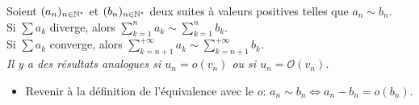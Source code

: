 \begin{tcolorbox}
    Soient $(a_n)_{n \in \mathbb{N}^\star}$ et $(b_n)_{n \in \mathbb{N}^\star}$ deux suites à valeurs positives telles que $a_n \sim b_n$.\\
    Si $ \sum a_k$ diverge, alors $\sum\limits_{k=1}^{n} a_k \sim \sum\limits_{k=1}^{n} b_k$. \\
    Si $ \sum a_k$ converge, alors $\sum\limits_{k=n+1}^{+ \infty} a_k \sim \sum\limits_{k=n+1}^{+ \infty} b_k$. \\
    \emph{Il y a des résultats analogues si $u_n = o(v_n)$ ou si $u_n = \mathcal{O}(v_n)$.}
\end{tcolorbox}

\begin{itemize}
    \item Revenir à la définition de l'équivalence avec le $o$: $a_n \sim b_n \Longleftrightarrow a_n -b_n = o(b_n)$.
\end{itemize}